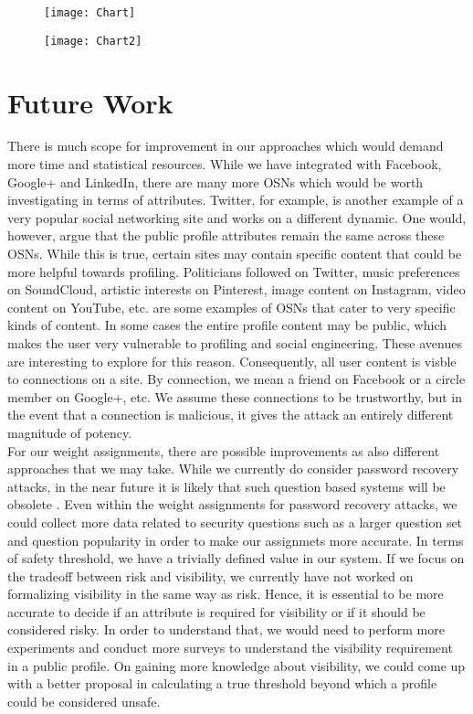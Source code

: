 \documentclass[10pt,conference]{IEEEtran}
\begin{document}
	\begin{figure}[h]
		\centering
		\texttt{[image: Chart]}
	\end{figure}
 
	\begin{figure}[h]
		\centering
		\texttt{[image: Chart2]}
	\end{figure}

\section{Future Work}
There is much scope for improvement in our approaches which would demand more time and statistical resources. While we have integrated with Facebook, Google+ and LinkedIn, there are many more OSNs which would be worth investigating in terms of attributes. Twitter, for example, is another example of a very popular social networking site and works on a different dynamic. One would, however, argue that the public profile attributes remain the same across these OSNs. While this is true, certain sites may contain specific content that could be more helpful towards profiling. Politicians followed on Twitter, music preferences on SoundCloud, artistic interests on Pinterest, image content on Instagram, video content on YouTube, etc. are some examples of OSNs that cater to very specific kinds of content. In some cases the entire profile content may be public, which makes the user very vulnerable to profiling and social engineering. These avenues are interesting to explore for this reason. Consequently, all user content is visble to connections on a site. By connection, we mean a friend on Facebook or a circle member on Google+, etc. We assume these connections to be trustworthy, but in the event that a connection is malicious, it gives the attack an entirely different magnitude of potency.\\

For our weight assignments, there are possible improvements as also different approaches that we may take. While we currently do consider password recovery attacks, in the near future it is likely that such question based systems will be obsolete \cite{google}. Even within the weight assignments for password recovery attacks, we could collect more data related to security questions such as a larger question set and question popularity in order to make our assignmets more accurate. In terms of safety threshold, we have a trivially defined value in our system. If we focus on the tradeoff between risk and visibility, we currently have not worked on formalizing visibility in the same way as risk. Hence, it is essential to be more accurate to decide if an attribute is required for visibility or if it should be considered risky. In order to understand that, we would need to perform more experiments and conduct more surveys to understand the visibility requirement in a public profile. On gaining more knowledge about visibility, we could come up with a better proposal in calculating a true threshold beyond which a profile could be considered unsafe.\\
\end{document}
